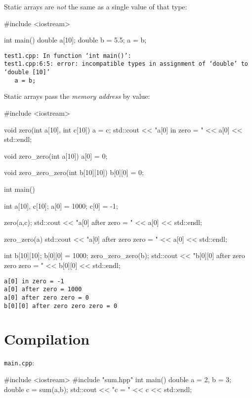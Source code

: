 \documentclass[12pt,letterpaper,twoside]{article}
\begin{document}
Static arrays are \textit{not} the same as a single value of that type:
\begin{cpp}
#include <iostream>

int main() {
  double a[10];
  double b = 5.5;
  a = b;
}
\end{cpp}
\vspace{-3ex}
{
\footnotesize
\begin{verbatim}
test1.cpp: In function ‘int main()’:
test1.cpp:6:5: error: incompatible types in assignment of ‘double’ to ‘double [10]’
   a = b;
\end{verbatim}
}

Static arrays pass the \textit{memory address} by value:
\begin{cpp}
#include <iostream>

void zero(int a[10], int c[10]){
	a = c;
	std::cout << "a[0] in zero = " << a[0] << std::endl;
}

void zero_zero(int a[10]){
	a[0] = 0;
}

void zero_zero_zero(int b[10][10]){
	b[0][0] = 0;
}

int main() {
  int a[10], c[10];
  a[0] = 1000;
  c[0] = -1;

  zero(a,c);
  std::cout << "a[0] after zero = " << a[0] << std::endl;

  zero_zero(a)
  std::cout << "a[0] after zero zero = " << a[0] << std::endl;

  int b[10][10];
  b[0][0] = 1000;
  zero_zero_zero(b);
  std::cout << "b[0][0] after zero zero zero = " << b[0][0] << std::endl;
}
\end{cpp}
\vspace{-3ex}
{
\footnotesize
\begin{verbatim}
a[0] in zero = -1
a[0] after zero = 1000
a[0] after zero zero = 0
b[0][0] after zero zero zero = 0
\end{verbatim}
}

\newpage
\section{Compilation} \label{sec:compile}

\texttt{main.cpp}:
\begin{cpp}
#include <iostream> 
#include "sum.hpp"
 int main() {
  double a = 2, b = 3;   
  double c = sum(a,b);
  std::cout << "c = " << c << std::endl;
} 
\end{cpp}
\end{document}
